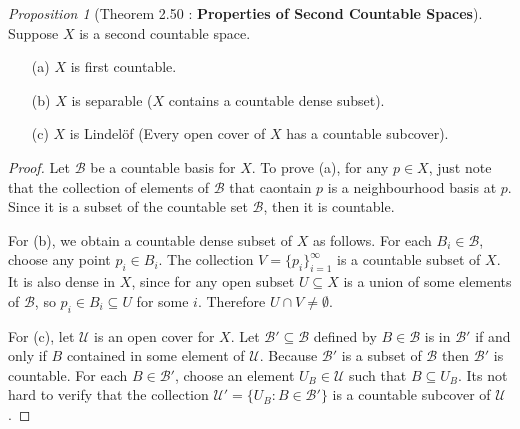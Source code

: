 \documentclass[a4paper]{article}
\theoremstyle{remark}
\newtheorem{prop}{Proposition}
\newcommand{\subhim}{\subseteq} %
\begin{document}
\begin{prop}[Theorem 2.50 : \textbf{Properties of Second Countable Spaces}]
Suppose $X$ is a second countable space.
\begin{enumerate}[nolistsep]
\item[(a)] $X$ is first countable.
\item[(b)] $X$ is separable ($X$ contains a countable dense subset).
\item[(c)] $X$ is Lindel\"{o}f (Every open cover of $X$ has a countable subcover).
\end{enumerate}
\end{prop}
\begin{proof}
Let $\mathcal{B}$ be a countable basis for $X$. To prove (a), for any $p\in X$, just note that the collection of elements of $\mathcal{B}$ that caontain $p$ is a neighbourhood basis at $p$. Since it is a subset of the countable set $\mathcal{B}$, then it is countable.

For (b), we obtain a countable dense subset of $X$ as follows. For each $B_i \in \mathcal{B}$, choose any point $p_i \in B_i$. The collection $V = \{p_i\}_{i=1}^{\infty}$ is a countable subset of $X$. It is also dense in $X$, since for any open subset $U \subhim X$ is a union of some elements of $\mathcal{B}$, so $p_i \in B_i \subhim U$ for some $i$.  Therefore $U \cap V \neq \emptyset$. 

For (c), let $\mathcal{U}$ is an open cover for $X$. Let $\mathcal{B'} \subhim \mathcal{B}$ defined by $B \in \mathcal{B}$ is in $\mathcal{B}'$ if and only if $B$ contained in some element of $\mathcal{U}$. Because $\mathcal{B}'$ is a subset of $\mathcal{B}$ then $\mathcal{B}'$ is countable.  For each $B \in \mathcal{B}'$, choose an element $U_B \in \mathcal{U}$ such that $B \subhim U_B$. Its not hard to verify that the collection $\mathcal{U}' = \{ U_B: B \in \mathcal{B}' \}$ is a countable subcover of $\mathcal{U}$. 
\end{proof}
\end{document}
